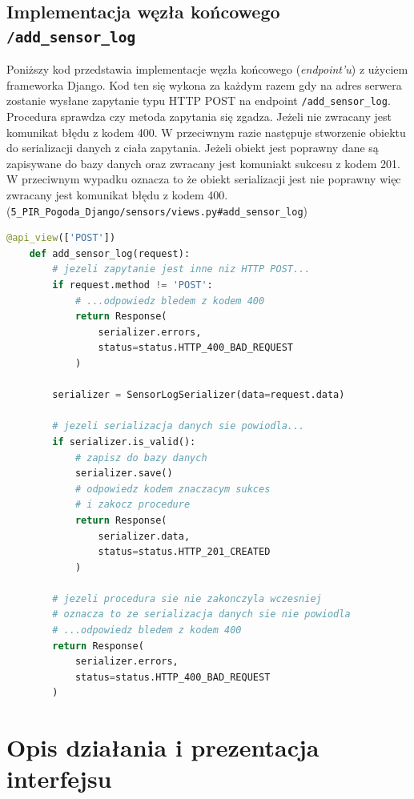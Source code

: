 \documentclass[12pt,a4paper]{article}
\begin{document}
    \subsection{Implementacja węzła końcowego \texttt{/add\_sensor\_log}}
    Poniższy kod przedstawia implementacje węzła końcowego (\emph{endpoint'u}) z użyciem frameworka Django. Kod ten się wykona za każdym razem gdy na adres serwera zostanie wysłane zapytanie typu HTTP POST na endpoint \texttt{/add\_sensor\_log}. Procedura sprawdza czy metoda zapytania się zgadza. Jeżeli nie zwracany jest komunikat błędu z kodem 400. W przeciwnym razie następuje stworzenie obiektu do serializacji danych z ciała zapytania. Jeżeli obiekt jest poprawny dane są zapisywane do bazy danych oraz zwracany jest komuniakt sukcesu z kodem 201. W przeciwnym wypadku oznacza to że obiekt serializacji jest nie poprawny więc zwracany jest komunikat błędu z kodem 400.\\
    (\texttt{5\_PIR\_Pogoda\_Django/sensors/views.py\#add\_sensor\_log})
    \begin{lstlisting}[language=Python]
    @api_view(['POST'])
    def add_sensor_log(request):
        # jezeli zapytanie jest inne niz HTTP POST...
        if request.method != 'POST':
            # ...odpowiedz bledem z kodem 400
            return Response(
                serializer.errors,
                status=status.HTTP_400_BAD_REQUEST
            )

        serializer = SensorLogSerializer(data=request.data)

        # jezeli serializacja danych sie powiodla...
        if serializer.is_valid():
            # zapisz do bazy danych
            serializer.save()
            # odpowiedz kodem znaczacym sukces
            # i zakocz procedure
            return Response(
                serializer.data,
                status=status.HTTP_201_CREATED
            )

        # jezeli procedura sie nie zakonczyla wczesniej
        # oznacza to ze serializacja danych sie nie powiodla
        # ...odpowiedz bledem z kodem 400
        return Response(
            serializer.errors,
            status=status.HTTP_400_BAD_REQUEST
        )
    \end{lstlisting}

    \section{Opis działania i prezentacja interfejsu}
\end{document}
